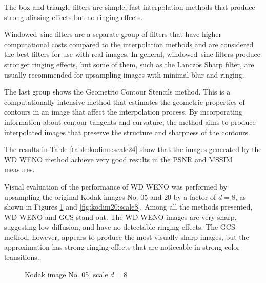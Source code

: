 The box and triangle filters are simple, fast interpolation methods that produce strong aliasing effects but no ringing effects.

Windowed--sinc filters are a separate group of filters that have higher computational costs compared to the interpolation methods and are considered the best filters for use with real images. In general, windowed--sinc filters produce stronger ringing effects, but some of them, such as the Lanczos Sharp filter, are usually recommended for upsampling images with minimal blur and ringing.

The last group shows the Geometric Contour Stencils method. This is a computationally intensive method that estimates the geometric properties of contours in an image that affect the interpolation process. By incorporating information about contour tangents and curvature, the method aims to produce interpolated images that preserve the structure and sharpness of the contours.


The results in Table \ref{table:kodims:scale24} show that the images generated by the {WD} WENO method achieve very good results in the PSNR and MSSIM measures.

Visual evaluation of the performance of {WD} WENO was performed by upsampling the original Kodak images No. $05$ and $20$ by a factor of $d = 8$, as shown in Figures \ref{fig:kodim05:scale8} and \ref{fig:kodim20:scale8}. Among all the methods presented, {WD} WENO and GCS stand out. The {WD} WENO images are very sharp, suggesting low diffusion, and have no detectable ringing effects. The GCS method, however, appears to produce the most visually sharp images, but the approximation has strong ringing effects that are noticeable in strong color transitions.
	\begin{figure}
		\begin{center}
			 \quad 
			 \quad 
			 \quad
			 \quad
			 \quad
			 \quad
			\caption{Kodak image No. 05, scale $d=8$}
			\label{fig:kodim05:scale8}
		\end{center}
	\end{figure}
	
